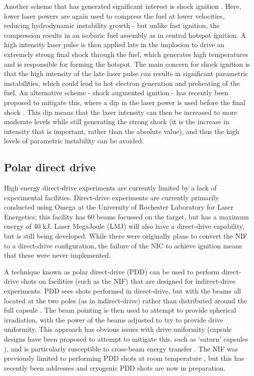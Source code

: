 Another scheme that has generated significant interest is shock ignition \cite{Betti2007}. Here, lower laser powers are again used to compress the fuel at lower velocities, reducing hydrodynamic instability growth - but unlike fast ignition, the compression results in an isobaric fuel assembly as in central hotspot ignition. A high intensity laser pulse is then applied late in the implosion to drive an extremely strong final shock through the fuel, which generates high temperatures and is responsible for forming the hotspot. The main concern for shock ignition is that the high intensity of the late laser pulse can results in significant parametric instabilities, which could lead to hot electron generation and preheating of the fuel. An alternative scheme - shock augmented ignition - has recently been proposed to mitigate this, where a dip in the laser power is used before the final shock \cite{Scott2022}. This dip means that the laser intensity can then be increased to more moderate levels while still generating the strong shock (it is the increase in intensity that is important, rather than the absolute value), and thus the high levels of parametric instability can be avoided.

\subsection{Polar direct drive}
High energy direct-drive experiments are currently limited by a lack of experimental facilities. Direct-drive experiments are currently primarily conducted using Omega at the University of Rochester Laboratory for Laser Energetics; this facility has 60 beams focussed on the target, but has a maximum energy of 40 \unit{\kilo\joule}. Laser MegaJoule (LMJ) will also have a direct-drive capability, but is still being developed. While there were originally plans to convert the NIF to a direct-drive configuration, the failure of the NIC to achieve ignition means that these were never implemented.

A technique known as polar direct-drive (PDD) can be used \cite{Skupsky2004} to perform direct-drive shots on facilities (such as the NIF) that are designed for indirect-drive experiments. PDD sees shots performed in direct-drive, but with the beams all located at the two poles (as in indirect-drive) rather than distributed around the full capsule \cite{Craxton2005}. The beam pointing is then used to attempt to provide spherical irradiation, with the power of the beams adjusted to try to provide drive uniformity. This approach has obvious issues with drive uniformity (capsule designs have been proposed to attempt to mitigate this, such as `saturn' capsules \cite{Craxton2005}), and is particularly susceptible to cross-beam energy transfer \cite{Collins2018}. The NIF was previously limited to performing PDD shots at room temperature \cite{Hohenberger2015}, but this has recently been addresses and cryogenic PDD shots are now in preparation.


